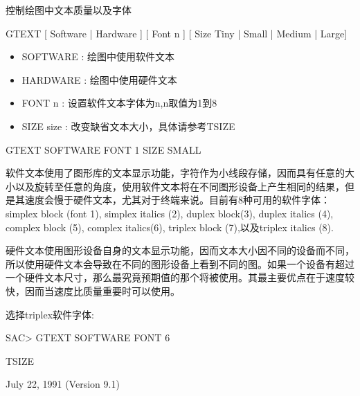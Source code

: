\label{cmd:gtext}

控制绘图中文本质量以及字体

GTEXT [ Software | Hardware ] [ Font n ] [ Size Tiny | Small | Medium | Large]

\begin{itemize}
\item SOFTWARE :  绘图中使用软件文本
\item HARDWARE :  绘图中使用硬件文本 
\item FONT n :  设置软件文本字体为n,n取值为1到8 
\item SIZE size :  改变缺省文本大小，具体请参考TSIZE 
\end{itemize}

GTEXT SOFTWARE FONT 1 SIZE SMALL

软件文本使用了图形库的文本显示功能，字符作为小线段存储，因而具有任意的大小以及旋转至任意的角度，使用软件文本将在不同图形设备上产生相同的结果，但是其速度会慢于硬件文本，尤其对于终端来说。目前有8种可用的软件字体：simplex block (font 1), simplex italics (2), duplex block(3), duplex italics (4), complex block (5), complex italics(6), triplex block (7),以及triplex italics (8).  

硬件文本使用图形设备自身的文本显示功能，因而文本大小因不同的设备而不同，所以使用硬件文本会导致在不同的图形设备上看到不同的图。如果一个设备有超过一个硬件文本尺寸，那么最究竟预期值的那个将被使用。其最主要优点在于速度较快，因而当速度比质量重要时可以使用。

选择triplex软件字体:
\begin{SACCode}
SAC> GTEXT SOFTWARE FONT 6
\end{SACCode}

TSIZE

July 22, 1991 (Version 9.1)

